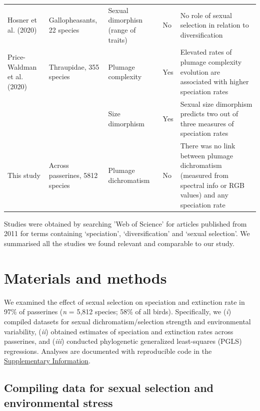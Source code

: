 \documentclass[]{article}
\begin{document}
\begin{table}[H]
{\begin{threeparttable}
\begin{tabular}{ll>{\raggedright\arraybackslash}p{10em}>{\raggedright\arraybackslash}p{3em}>{\raggedright\arraybackslash}p{27em}}
\cmidrule{1-5}
Hosner et al. (2020) & Gallopheasants, 22 species & Sexual dimorphisn (range of traits) & No & No role of sexual selection in relation to diversification\\
\cmidrule{1-5}
Price-Waldman et al. (2020) & Thraupidae, 355 species & Plumage complexity & Yes & Elevated rates of plumage complexity evolution are associated with higher speciation rates\\
\cmidrule{1-5}
 &  & Size dimorphism & Yes & Sexual size dimorphism predicts two out of three measures of speciation rates\\
\cmidrule{3-5}
\multirow{-2}{*}{\raggedright\arraybackslash This study} & \multirow{-2}{*}{\raggedright\arraybackslash Across passerines, 5812 species} & Plumage dichromatism & No & There was no link between plumage dichromatism (measured from spectral info or RGB values) and any speciation rate\\
\bottomrule
\end{tabular}
\begin{tablenotes}
\item Studies were obtained by searching 'Web of Science' for articles published from 2011 for terms containing ‘speciation’, ‘diversification’ and ‘sexual selection’. We summarised all the studies we found relevant and comparable to our study.
\end{tablenotes}
\end{threeparttable}}
\end{table}


\hypertarget{materials-and-methods}{%
\section{Materials and methods}\label{materials-and-methods}}

We examined the effect of sexual selection on speciation and extinction
rate in 97\% of passerines (\emph{n} = 5,812 species; 58\% of all
birds). Specifically, we (\emph{i}) compiled datasets for sexual
dichromatism/selection strength and environmental variability,
(\emph{ii}) obtained estimates of speciation and extinction rates across
passerines, and (\emph{iii}) conducted phylogenetic generalized
least-squares (PGLS) regressions. Analyses are documented with
reproducible code in the
\href{https://justincally.github.io/SexualSelection_Speciation/}{Supplementary Information}.

\hypertarget{compiling-data-for-sexual-selection-and-environmental-stress}{%
\subsection{Compiling data for sexual selection and environmental
stress}\label{compiling-data-for-sexual-selection-and-environmental-stress}}
\end{document}
